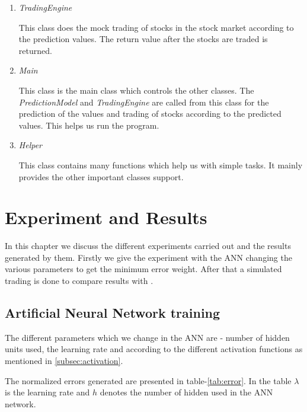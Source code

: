 \documentclass[a4paper,12bp]{report}
\begin{document}
\begin{enumerate}
\item \textit{TradingEngine}

This class does the mock trading of stocks in the stock market according to the prediction values. The return value after the stocks are traded is returned. 

\item \textit{Main}

This class is the main class which controls the other classes. The \textit{PredictionModel} and \textit{TradingEngine} are called from this class for the prediction of the values and trading of stocks according to the predicted values. This helps us run the program. 

\item \textit{Helper}

This class contains many functions which help us with simple tasks. It mainly provides the other important classes support. 

\end{enumerate}

\chapter{Experiment and Results}
In this chapter we discuss the different experiments carried out and the results generated by them. Firstly we give the experiment with the ANN changing the various parameters to get the minimum error weight. After that a simulated trading is done to compare results with \cite{Hagenau:2013}. 

\section{Artificial Neural Network training}
The different parameters which we change in the ANN are - number of hidden units used, the learning rate and according to the different activation functions as mentioned in \ref{subsec:activation}.

The normalized errors generated are presented in table-\ref{tab:error}. In the table $\lambda$ is the learning rate and $h$ denotes the number of hidden used in the ANN network. 
\end{document}
